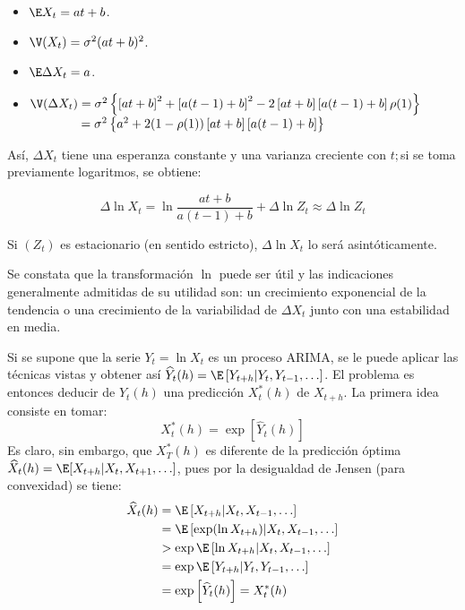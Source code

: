 \begin{itemize}
\item $\E X_{t}  = at+b$.
\item $\V(X_{t}) =\sigma^{2}(at +b)^{2}$.
\item $\E\Delta X_{t} = a$.
\item $\V(\Delta X_{t}) = \sigma^{2}\left\{ {\left[ {at+b} \right]^{2}+\left[ {a(t-1)+b} \right]^{2}-2\left[ {at+b} \right]\left[ {a(t-1)+b} \right]\rho (1)} \right\}$\\ $\phantom{\V(\Delta X_{t}) }=\sigma^{2}\left\{ {a^{2}+2(1-\rho (1))\left[ {at+b} \right]\left[ {a(t-1)+b} \right]} \right\}$
\end{itemize}

As\'{i}, $\Delta X_{t}$ tiene una esperanza constante y una varianza creciente con $t; $si se toma previamente logaritmos, se obtiene: 

\[
\Delta \ln X_{t} =\ln \frac{at+b}{a(t-1)+b}+\Delta \ln Z_{t} 
\approx \Delta \ln Z_{t} 
\]

Si $(Z_{t})$ es estacionario (en sentido estricto), $\Delta \ln X_{t}$ lo ser\'{a} asint\'{o}ticamente.\newline

Se constata que la transformaci\'{o}n $\ln$ puede ser \'{u}til y las indicaciones generalmente admitidas de su utilidad son: un crecimiento exponencial de la tendencia o una crecimiento de la variabilidad de $\Delta X_{t}$ junto con una estabilidad en media.\newline

Si se supone que la serie $Y_{t} =\ln X_{t} $ es un proceso ARIMA, se le puede aplicar las t\'{e}cnicas vistas y obtener as\'{i} $\widehat{Y}_{t} (h)=\E\left[ Y_{t+h} | Y_{t}  ,Y_{t-1} ,\ldots  \right]$. El problema es entonces deducir de $\widehat{Y}_{t} (h)$ una predicci\'{o}n $X_{t}^{\ast } (h)$ de $X_{t+h} $. La primera idea consiste en tomar:
\[
X_{t}^{\ast } (h)=\exp \left[ {\widehat{Y} _{t} (h)} \right]
\]
Es claro, sin embargo, que $X_T^{\ast}(h)$ es diferente de la predicci\'{o}n \'{o}ptima $\widehat{X}_t(h)=\E[X_{t+h}|X_t,X_{t+1},\ldots]$, pues por la desigualdad de Jensen (para convexidad) se tiene:
\begin{align*}
\widehat{X} _{t} (h)&=\E\left[ X_{t+h} | X_{t} ,X_{t-1} ,\ldots \right]\\
	&=\E\left[ \exp (\ln X_{t+h}) | X_{t} ,X_{t-1} ,\ldots \right]\\
	&>\exp \E\left[ \ln X_{t+h} | X_{t} ,X_{t-1} ,\ldots  \right]\\
	&=\exp \E\left[ Y_{t+h} | Y_{t} ,Y_{t-1} ,\ldots \right]\\
	&=\exp \left[ \widehat{Y}_{t} (h) \right]=X_{t}^{\ast } (h) 
\end{align*}

